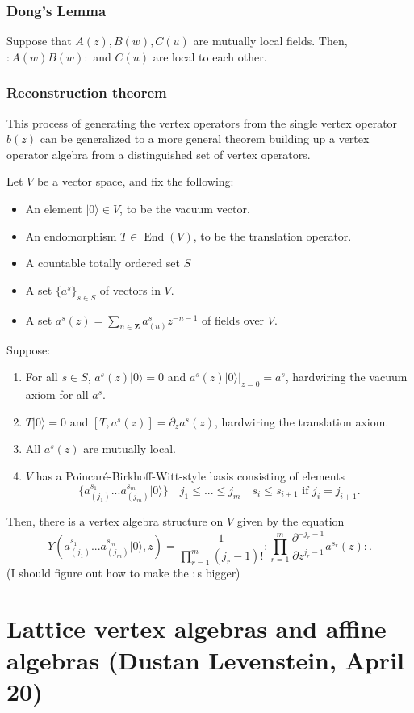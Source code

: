 \documentclass{article}
\newcommand{\ZZ}{\mathbold{Z}}
\newcommand{\vac}{|0\rangle}
\newcommand{\normord}[1]{:\mathrel{#1}:}
\DeclareMathOperator{\End}{End}
\begin{document}
\subsubsection{Dong's Lemma}
Suppose that $A(z),B(w),C(u)$ are mutually local fields.  Then, $\normord{A(w)B(w)}$ and $C(u)$ are local to each other.
\subsubsection{Reconstruction theorem}
\label{sec:recthm}
This process of generating the vertex operators from the single vertex operator $b(z)$ can be generalized to a more general theorem building up a vertex operator algebra from a distinguished set of vertex operators.

Let $V$ be a vector space, and fix the following:
\begin{itemize}
\item An element $\vac \in V$, to be the vacuum vector.
\item An endomorphism $T \in \End(V)$, to be the translation operator.
\item A countable totally ordered set $S$
\item A set $\{a^s\}_{s \in S}$ of vectors in $V$.
\item A set $a^s(z)=\sum_{n \in \ZZ}a^s_{(n)}z^{-n-1}$ of fields over $V$.
\end{itemize}
Suppose:
\begin{enumerate}
\item For all $s \in S$, $a^s(z)\vac=0$ and $a^s(z)\vac|_{z=0}=a^s$, hardwiring the vacuum axiom for all $a^s$.
\item $T\vac=0$ and $[T,a^s(z)]=\partial_za^s(z)$, hardwiring the translation axiom.
\item All $a^s(z)$ are mutually local.
\item $V$ has a Poincaré-Birkhoff-Witt-style basis consisting of elements
\[
  \{a^{s_1}_{(j_1)}...a^{s_m}_{(j_m)}\vac\}\quad
  j_1 \le ... \le j_m\quad
  s_i \le s_{i+1}\textrm{ if }j_i=j_{i+1}.
\]
\end{enumerate}
Then, there is a vertex algebra structure on $V$ given by the equation
\[
  Y(a^{s_1}_{(j_1)}...a^{s_m}_{(j_m)}\vac,z)=\frac{1}{\prod_{r=1}^m(j_r-1)!} \normord{\prod_{r=1}^m \frac{\partial^{-j_r-1}}{\partial z^{j_r-1}}a^{s_r}(z)}.
\]
(I should figure out how to make the $:$s bigger)

\section{Lattice vertex algebras and affine algebras (Dustan Levenstein, April 20)}
\label{sec:latticeaffine}
\end{document}
